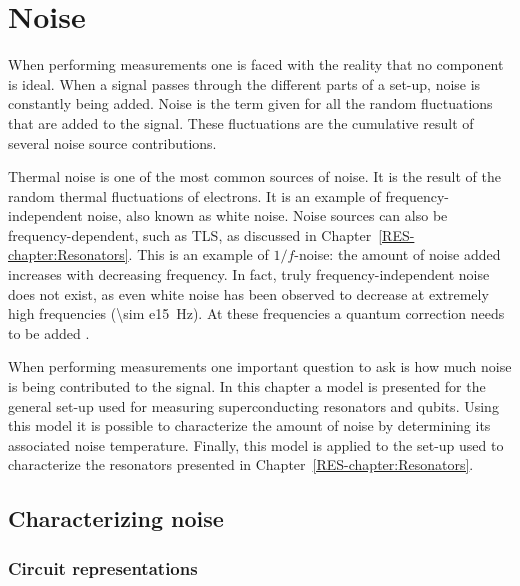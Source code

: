 
\newcommand{\vrms}{\text{v}_\text{n}^\text{rms}}
\newcommand{\vsq}{\overline{\text{v}_\text{n}^2}}
\newcommand{\vn}{\text{v}_\text{n}}
\newcommand{\vin}{\text{v}_\text{in}}
\newcommand{\vout}{\text{v}_\text{out}}
\newcommand{\Sin}{\text{S}_{\vn}^\text{in}}
\newcommand{\Sout}{\text{S}_{\vn}^\text{out}}
\newcommand{\Svn}{\text{S}_{\vn}}


\chapter{Noise}

When performing measurements one is faced with the reality that no component is ideal. When a signal passes through the different parts of a set-up, noise is constantly being added. Noise is the term given for all the random fluctuations that are added to the signal. These fluctuations are the cumulative result of several noise source contributions.

Thermal noise is one of the most common sources of noise. It is the result of the random thermal fluctuations of electrons. It is an example of frequency-independent noise, also known as white noise. Noise sources can also be frequency-dependent, such as TLS, as discussed in Chapter~\ref{RES-chapter:Resonators}. This is an example of $1/f$-noise: the amount of noise added increases with decreasing frequency. In fact, truly frequency-independent noise does not exist, as even white noise has been observed to decrease at extremely high frequencies (\SI{\sim e15}{\hertz}). At these frequencies a quantum correction needs to be added \cite[p.~50]{vasilescu2006electronic}.

When performing measurements one important question to ask is how much noise is being contributed to the signal. In this chapter a model is presented for the general set-up used for measuring superconducting resonators and qubits. Using this model it is possible to characterize the amount of noise by determining its associated noise temperature. Finally, this model is applied to the set-up used to characterize the resonators presented in Chapter~\ref{RES-chapter:Resonators}.

\section{Characterizing noise}

\subsection{Circuit representations}



